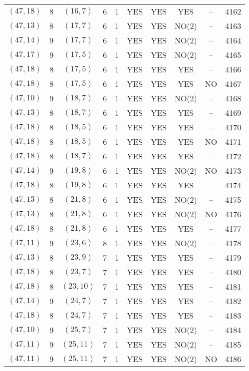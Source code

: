 \begin{longtable}{|c|c|c|c|c|c|c|c|c|c|}
$(47, 18)$ & 8 & $(16, 7)$ & 6 & 1 & YES & YES & YES & -- & 4162\\
$(47, 13)$ & 8 & $(17, 7)$ & 6 & 1 & YES & YES & NO(2) & -- & 4163\\
$(47, 14)$ & 9 & $(17, 7)$ & 6 & 1 & YES & YES & NO(2) & -- & 4164\\
$(47, 17)$ & 9 & $(17, 5)$ & 6 & 1 & YES & YES & NO(2) & -- & 4165\\
$(47, 18)$ & 8 & $(17, 5)$ & 6 & 1 & YES & YES & YES & -- & 4166\\
$(47, 18)$ & 8 & $(17, 5)$ & 6 & 1 & YES & YES & YES & NO & 4167\\
$(47, 10)$ & 9 & $(18, 7)$ & 6 & 1 & YES & YES & NO(2) & -- & 4168\\
$(47, 13)$ & 8 & $(18, 7)$ & 6 & 1 & YES & YES & YES & -- & 4169\\
$(47, 18)$ & 8 & $(18, 5)$ & 6 & 1 & YES & YES & YES & -- & 4170\\
$(47, 18)$ & 8 & $(18, 5)$ & 6 & 1 & YES & YES & YES & NO & 4171\\
$(47, 18)$ & 8 & $(18, 7)$ & 6 & 1 & YES & YES & YES & -- & 4172\\
$(47, 14)$ & 9 & $(19, 8)$ & 6 & 1 & YES & YES & NO(2) & NO & 4173\\
$(47, 18)$ & 8 & $(19, 8)$ & 6 & 1 & YES & YES & YES & -- & 4174\\
$(47, 13)$ & 8 & $(21, 8)$ & 6 & 1 & YES & YES & NO(2) & -- & 4175\\
$(47, 13)$ & 8 & $(21, 8)$ & 6 & 1 & YES & YES & NO(2) & NO & 4176\\
$(47, 18)$ & 8 & $(21, 8)$ & 6 & 1 & YES & YES & YES & -- & 4177\\
$(47, 11)$ & 9 & $(23, 6)$ & 8 & 1 & YES & YES & NO(2) & -- & 4178\\
$(47, 13)$ & 8 & $(23, 9)$ & 7 & 1 & YES & YES & YES & -- & 4179\\
$(47, 18)$ & 8 & $(23, 7)$ & 7 & 1 & YES & YES & YES & -- & 4180\\
$(47, 18)$ & 8 & $(23, 10)$ & 7 & 1 & YES & YES & YES & -- & 4181\\
$(47, 14)$ & 9 & $(24, 7)$ & 7 & 1 & YES & YES & YES & -- & 4182\\
$(47, 18)$ & 8 & $(24, 7)$ & 7 & 1 & YES & YES & YES & -- & 4183\\
$(47, 10)$ & 9 & $(25, 7)$ & 7 & 1 & YES & YES & NO(2) & -- & 4184\\
$(47, 11)$ & 9 & $(25, 11)$ & 7 & 1 & YES & YES & NO(2) & -- & 4185\\
$(47, 11)$ & 9 & $(25, 11)$ & 7 & 1 & YES & YES & NO(2) & NO & 4186\\

\end{longtable}
